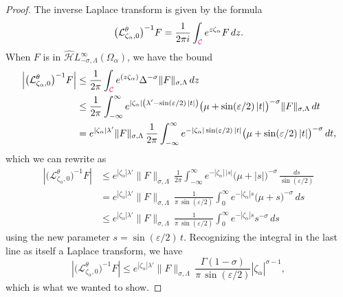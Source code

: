 \documentclass{article}
\let\Re\relax
\DeclareMathOperator{\Re}{Re}
\newcommand{\dualsingexp}[2]{\widehat{\mathcal{H}}L^\infty_{#1, #2}}
\newcommand{\laplace}{\mathcal{L}}
\theoremstyle{definition}
\theoremstyle{plain}
\begin{document}
\begin{proof}
The inverse Laplace transform is given by the formula
\[ \big(\laplace_{\zeta_\alpha, 0}^\theta\big)^{-1} F = \frac{1}{2 \pi i} \int_{\textcolor{magenta}{\mathcal{C}}} e^{z\zeta_\alpha} F\,dz. \]
When $F$ is in $\dualsingexp{-\sigma}{\Lambda}(\Omega_\alpha)$, we have the bound
\begin{align*}
\left|\big(\laplace_{\zeta_\alpha, 0}^\theta\big)^{-1} F\right| & \le \frac{1}{2 \pi} \int_{\textcolor{magenta}{\mathcal{C}}} e^{\Re(z\zeta_\alpha)} \Delta^{-\sigma} \|F\|_{\sigma, \Lambda}\,dz \\
& \le \frac{1}{2 \pi} \int_{-\infty}^\infty e^{|\zeta_\alpha| \left(\lambda' - \sin(\varepsilon/2)\,|t|\right)} \big(\mu + \sin(\varepsilon/2)\,|t|\big)^{-\sigma} \|F\|_{\sigma, \Lambda}\,dt \\
& = e^{|\zeta_\alpha| \lambda'} \|F\|_{\sigma, \Lambda}\,\frac{1}{2 \pi} \int_{-\infty}^\infty e^{-|\zeta_\alpha| \sin(\varepsilon/2)\,|t|} \big(\mu + \sin(\varepsilon/2)\,|t|\big)^{-\sigma}\,dt,
\end{align*}
which we can rewrite as
\begin{align*}
\left|\big(\laplace_{\zeta_\alpha, 0}^\theta\big)^{-1} F\right| & \le e^{|\zeta_\alpha| \lambda'} \|F\|_{\sigma, \Lambda}\,\frac{1}{2 \pi} \int_{-\infty}^\infty e^{-|\zeta_\alpha| \,|s|} \big(\mu + |s|\big)^{-\sigma}\,\frac{ds}{\sin(\varepsilon/2)} \\
& = e^{|\zeta_\alpha| \lambda'} \|F\|_{\sigma, \Lambda}\,\frac{1}{\pi\,\sin(\varepsilon/2)} \int_0^\infty e^{-|\zeta_\alpha|s} \big(\mu + s\big)^{-\sigma}\,ds \\
& \le e^{|\zeta_\alpha| \lambda'} \|F\|_{\sigma, \Lambda}\,\frac{1}{\pi\,\sin(\varepsilon/2)} \int_0^\infty e^{-|\zeta_\alpha|s} s^{-\sigma}\,ds
\end{align*}
using the new parameter $s = \sin(\varepsilon/2)\,t$. Recognizing the integral in the last line as itself a Laplace transform, we have
\[ \left|\big(\laplace_{\zeta_\alpha, 0}^\theta\big)^{-1} F\right| \le e^{|\zeta_\alpha| \lambda'} \|F\|_{\sigma, \Lambda}\,\frac{\Gamma(1-\sigma)}{\pi\,\sin(\varepsilon/2)} |\zeta_\alpha|^{\sigma-1}, \]
which is what we wanted to show.


\end{proof}
\end{document}
